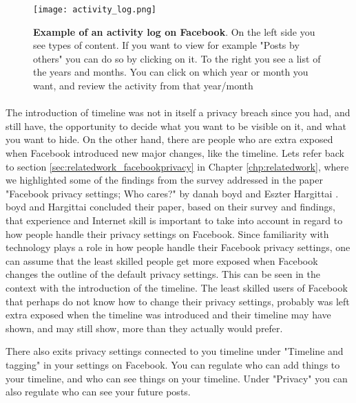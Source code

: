 \begin{figure}[h!]
\centering
\texttt{[image: activity\_log.png]}
\caption [Example of an activity log on Facebook.]{\textbf{Example of an activity log on Facebook}. On the left side you see types of content. If you want to view for example "Posts by others" you can do so by clicking on it. To the right you see a list of the years and months. You can click on which year or month you want, and review the activity from that year/month \cite{activitylog}} 
\label{fig:activitylog}
\end{figure}

\paragraph{}
The introduction of timeline was not in itself a privacy breach since you had, and still have, the opportunity to decide what you want to be visible on it, and what you want to hide. On the other hand, there are people who are extra exposed when Facebook introduced new major changes, like the timeline. Lets refer back to section \ref{sec:relatedwork_facebookprivacy} in Chapter \ref{chp:relatedwork}, where we highlighted some of the findings from the survey addressed in the paper "Facebook privacy settings; Who cares?" by danah boyd and Eszter Hargittai \cite{whocares}. boyd and Hargittai concluded their paper, based on their survey and findings, that experience and Internet skill is important to take into account in regard to how people handle their privacy settings on Facebook. Since familiarity with technology plays a role in how people handle their Facebook privacy settings, one can assume that the least skilled people get more exposed when Facebook changes the outline of the default privacy settings. 
This can be seen in the context with the introduction of the timeline. The least skilled users of Facebook that perhaps do not know how to change their privacy settings, probably was left extra exposed when the timeline was introduced and their timeline may have shown, and may still show, more than they actually would prefer. 

There also exits privacy settings connected to you timeline under "Timeline and tagging" in your settings on Facebook. You can regulate who can add things to your timeline, and who can see things on your timeline. Under "Privacy" you can also regulate who can see your future posts. 

